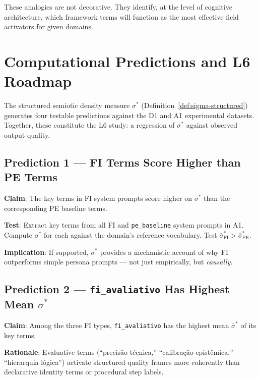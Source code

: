 \documentclass[12pt,a4paper]{article}
\begin{document}
These analogies are not decorative.
They identify, at the level of cognitive architecture, which framework terms will function as the most effective field activators for given domains.


\section{Computational Predictions and L6 Roadmap}
\label{appendix:predictions}

The structured semiotic density measure $\sigma^*$ (Definition~\ref{def:sigma-structured})
generates four testable predictions against the D1 and A1 experimental datasets.
Together, these constitute the L6 study: a regression of $\bar{\sigma}^*$ against
observed output quality.

\subsection*{Prediction 1 — FI Terms Score Higher than PE Terms}

\textbf{Claim}: The key terms in FI system prompts score higher on $\sigma^*$ than the
corresponding PE baseline terms.

\textbf{Test}: Extract key terms from all FI and \texttt{pe\_baseline} system prompts in A1.
Compute $\sigma^*$ for each against the domain's reference vocabulary.
Test $\bar{\sigma}^*_{\mathrm{FI}} > \bar{\sigma}^*_{\mathrm{PE}}$.

\textbf{Implication}: If supported, $\sigma^*$ provides a mechanistic account of why
FI outperforms simple persona prompts — not just empirically, but \textit{causally}.

\subsection*{Prediction 2 — \texttt{fi\_avaliativo} Has Highest Mean $\sigma^*$}

\textbf{Claim}: Among the three FI types, \texttt{fi\_avaliativo} has the highest mean
$\bar{\sigma}^*$ of its key terms.

\textbf{Rationale}: Evaluative terms (``precisão técnica,'' ``calibração epistêmica,''
``hierarquia lógica'') activate structured quality frames more coherently than declarative
identity terms or procedural step labels.
\end{document}
